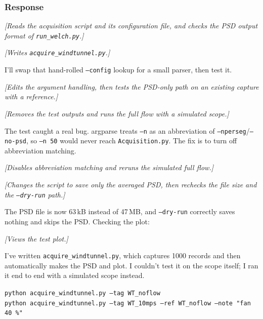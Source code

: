  \subsubsection{Response}
 \begin{tcolorbox}[breakable, colback=gray!4, colframe=gray!50,
 	boxrule=0.4pt, arc=2pt, fontupper=\small,
 	left=6pt, right=6pt, top=4pt, bottom=4pt]
 	\textit{[Reads the acquisition script and its configuration file, and checks the PSD output format of \texttt{run\_welch.py}.]}
 	
 	\textit{[Writes \texttt{acquire\_windtunnel.py}.]}
 	
 	I'll swap that hand-rolled \texttt{--config} lookup for a small parser, then test it.
 	
 	\textit{[Edits the argument handling, then tests the PSD-only path on an existing capture with a reference.]}
 	
 	\textit{[Removes the test outputs and runs the full flow with a simulated scope.]}
 	
 	The test caught a real bug. argparse treats \texttt{--n} as an abbreviation of \texttt{--nperseg}/\texttt{--no-psd}, so \texttt{--n 50} would never reach \texttt{Acquisition.py}. The fix is to turn off abbreviation matching.
 	
 	\textit{[Disables abbreviation matching and reruns the simulated full flow.]}
 	
 	\textit{[Changes the script to save only the averaged PSD, then rechecks the file size and the \texttt{--dry-run} path.]}
 	
 	The PSD file is now 63\,kB instead of 47\,MB, and \texttt{--dry-run} correctly saves nothing and skips the PSD. Checking the plot:
 	
 	\textit{[Views the test plot.]}
 	
 	I've written \texttt{acquire\_windtunnel.py}, which captures 1000 records and then automatically makes the PSD and plot. I couldn't test it on the scope itself; I ran it end to end with a simulated scope instead.
 	
 	\texttt{python acquire\_windtunnel.py --tag WT\_noflow}\\
 	\texttt{python acquire\_windtunnel.py --tag WT\_10mps --ref WT\_noflow --note "fan 40 \%"}
 	

\end{tcolorbox}
